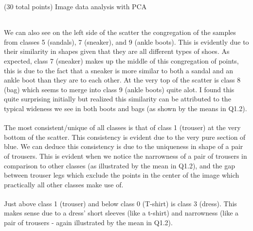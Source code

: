 \documentclass[12pt]{article}
\begin{document}
\begin{question}{(30 total points) Image data analysis with PCA}
\begin{subquestion}
\begin{answerbox}{51.75em}
{\\
        We can also see on the left side of the scatter the congregation of the samples from classes 5 (sandals), 7 (sneaker), and 9 (ankle boots). This is evidently due to their similarity in shapes given that they are all different types of shoes. As expected, class 7 (sneaker) makes up the middle of this congregation of points, this is due to the fact that a sneaker is more similar to both a sandal and an ankle boot than they are to each other. At the very top of the scatter is class 8 (bag) which seems to merge into class 9 (ankle boots) quite alot. I found this quite surprising initially but realized this similarity can be attributed to the typical wideness we see in both boots and bags (as shown by the means in Q1.2).\\
\\
        The most consistent/unique of all classes is that of class 1 (trouser) at the very bottom of the scatter. This consistency is evident due to the very pure section of blue. We can deduce this consistency is due to the uniqueness in shape of a pair of trousers. This is evident when we notice the narrowness of a pair of trousers in comparison to other classes (as illustrated by the mean in Q1.2), and the gap between trouser legs which exclude the points in the center of the image which practically all other classes make use of.\\
\\
        Just above class 1 (trouser) and below class 0 (T-shirt) is class 3 (dress). This makes sense due to a dress' short sleeves (like a t-shirt) and narrowness (like a pair of trousers - again illustrated by the mean in Q1.2).
        }
      \end{answerbox}
  


   \end{subquestion}
   

\end{question}
\clearpage
%
%
\end{document}
